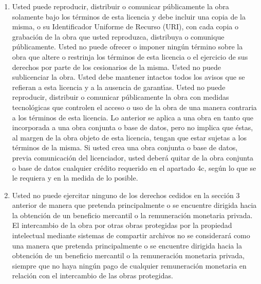 \begin{enumerate}
\begin{enumerate}
  \item Usted puede reproducir, distribuir o comunicar p\'ublicamente
    la obra solamente bajo los t\'erminos de esta licencia y debe
    incluir una copia de la misma, o su Identificador Uniforme de
    Recurso (URI), con cada copia o grabaci\'on de la obra que usted
    reproduzca, distribuya o comunique p\'ublicamente. Usted no puede
    ofrecer o imponer ning\'un t\'ermino sobre la obra que altere o
    restrinja los t\'erminos de esta licencia o el ejercicio de sus
    derechos por parte de los cesionarios de la misma. Usted no puede
    sublicenciar la obra.  Usted debe mantener intactos todos los
    avisos que se refieran a esta licencia y a la ausencia de
    garant\'\i{}as.  Usted no puede reproducir, distribuir o comunicar
    p\'ublicamente la obra con medidas tecnol\'ogicas que controlen el
    acceso o uso de la obra de una manera contraria a los t\'erminos
    de esta licencia. Lo anterior se aplica a una obra en tanto que
    incorporada a una obra conjunta o base de datos, pero no implica
    que \'estas, al margen de la obra objeto de esta licencia, tengan
    que estar sujetas a los t\'erminos de la misma. Si usted crea una
    obra conjunta o base de datos, previa comunicaci\'on del
    licenciador, usted deber\'a quitar de la obra conjunta o base de
    datos cualquier cr\'edito requerido en el apartado 4c, seg\'un lo
    que se le requiera y en la medida de lo posible.

  \item Usted no puede ejercitar ninguno de los derechos cedidos en la
    secci\'on 3 anterior de manera que pretenda principalmente o se
    encuentre dirigida hacia la obtenci\'on de un beneficio mercantil
    o la remuneraci\'on monetaria privada. El intercambio de la obra
    por otras obras protegidas por la propiedad intelectual mediante
    sistemas de compartir archivos no se considerar\'a como una manera
    que pretenda principalmente o se encuentre dirigida hacia la
    obtenci\'on de un beneficio mercantil o la remuneraci\'on
    monetaria privada, siempre que no haya ning\'un pago de cualquier
    remuneraci\'on monetaria en relaci\'on con el intercambio de las
    obras protegidas.


\end{enumerate}
\end{enumerate}
